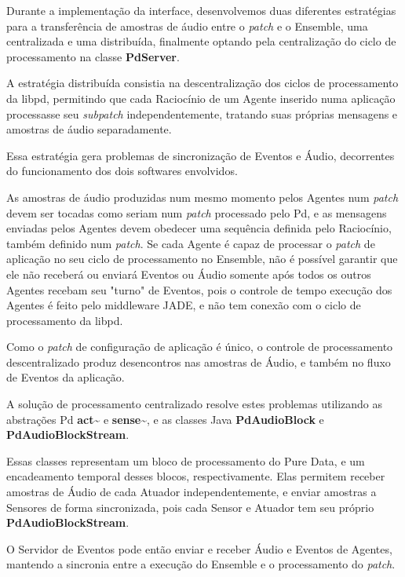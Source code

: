 \documentclass[a4paper, 11pt, twoside]{article}
\begin{document}
\begin{multicols}{2}
Durante a implementação da interface, desenvolvemos duas diferentes estratégias
para a transferência de amostras de áudio entre o \textit{patch} e o Ensemble, 
uma centralizada e uma distribuída, finalmente optando pela centralização 
do ciclo de processamento na classe \textbf{PdServer}.

A estratégia distribuída consistia na descentralização dos ciclos de
processamento da libpd, permitindo que cada Raciocínio de um Agente
inserido numa aplicação processasse seu \textit{subpatch} independentemente,
tratando suas próprias mensagens e amostras de áudio separadamente.

Essa estratégia gera problemas de sincronização de Eventos e Áudio,
decorrentes do funcionamento dos dois softwares envolvidos.

As amostras de áudio produzidas num mesmo momento pelos Agentes 
num \textit{patch} devem ser tocadas como seriam num \textit{patch}
processado pelo Pd, e as mensagens enviadas pelos Agentes devem obedecer
uma sequência definida pelo Raciocínio, também definido num \textit{patch}.
Se cada Agente é capaz de processar o \textit{patch} de aplicação
no seu ciclo de processamento no Ensemble, não é possível garantir que ele
não receberá ou enviará Eventos ou Áudio somente após todos os outros Agentes 
recebam seu "turno" de Eventos, pois o controle de tempo execução dos Agentes 
é feito pelo middleware JADE, e não tem conexão com o ciclo de processamento
da libpd.

Como o \textit{patch} de configuração de aplicação é único, o controle de
processamento descentralizado produz desencontros nas amostras de Áudio, 
e também no fluxo de Eventos da aplicação.

A solução de processamento centralizado resolve estes problemas utilizando
as abstrações Pd \textbf{act\textasciitilde} e \textbf{sense\textasciitilde},
e as classes Java \textbf{PdAudioBlock} e \textbf{PdAudioBlockStream}.

Essas classes representam um bloco de processamento do Pure Data, e um
encadeamento temporal desses blocos, respectivamente. Elas permitem
receber amostras de Áudio de cada Atuador independentemente, e enviar
amostras a Sensores de forma sincronizada, pois cada Sensor e Atuador
tem seu próprio \textbf{PdAudioBlockStream}.

O Servidor de Eventos pode então enviar e receber Áudio e Eventos de Agentes,
mantendo a sincronia entre a execução do Ensemble e o processamento 
do \textit{patch}.


\end{multicols}
\end{document}
